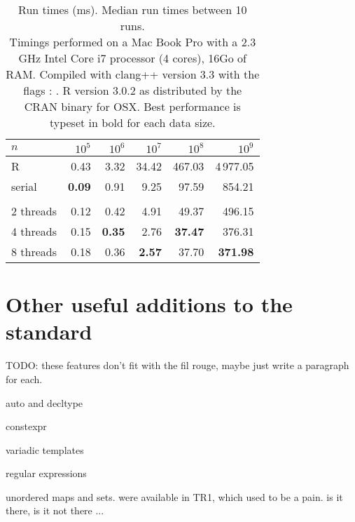 \begin{table}
\centering
\begin{tabular}{lrrrrr}
\toprule 
$n$ & $10^5$ & $10^6$ & $10^7$ & $10^8$ & $10^9$ \\ 
\midrule          
R         & 0.43          & 3.32  & 34.42 & 467.03 & 4\,977.05 \\
serial    & \textbf{0.09} & 0.91  &  9.25 &  97.59 &    854.21 \\
\hspace{1.5cm} & 
\hspace{1.5cm} & 
\hspace{1.5cm} &
\hspace{1.5cm} & 
\hspace{1.5cm} & 
\hspace{1.5cm} \\
2 threads & 0.12          & 0.42          & 4.91          &  49.37          & 496.15          \\
4 threads & 0.15          & \textbf{0.35} & 2.76          &  \textbf{37.47} & 376.31          \\
8 threads & 0.18          & 0.36          & \textbf{2.57} &  37.70          & \textbf{371.98} \\
\bottomrule
\end{tabular}
\caption{\label{table:count}Run times (ms). Median run times between 10 runs.\\ 
{\footnotesize Timings performed on a Mac Book Pro with a 2.3 GHz Intel Core i7 processor (4 cores), 16Go of RAM. 
Compiled with clang++ version 3.3 with the flags : . R version 3.0.2 
as distributed by the CRAN binary for OSX. Best performance is typeset in bold for each data size. }}
\end{table}

\section{Other useful additions to the standard}

TODO: 
these features don't fit with the fil rouge, maybe just write a paragraph for each. 

auto and decltype

constexpr

variadic templates

regular expressions

unordered maps and sets. were available in TR1, which used to be a pain. is it there, is it not there ...

